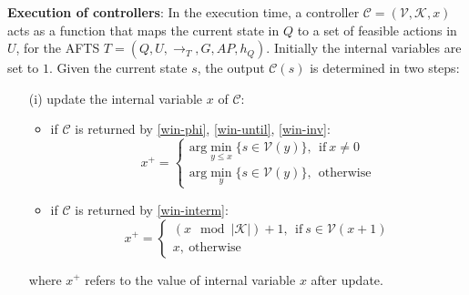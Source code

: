 
\begin{definition} \textbf{Execution of controllers}:
	In the execution time, a controller $ \mathcal{C}=(\mathcal{V},\mathcal{K},x) $ acts as a function that maps the current state in $ Q $ to a set of feasible actions in $ U $, for the AFTS $ T = (Q,U,\rightarrow_T, G,AP,h_Q)$. Initially the internal variables are set to $ 1 $. Given the current state $ s $, the output $ \mathcal{C}(s) $ is determined in two steps:
	\begin{itemize}
		\item[(i)] update the internal variable $ x $ of $ \mathcal{C} $: 
		\begin{itemize}
			\item 	if $ \mathcal{C} $ is returned by \eqref{win-phi}, \eqref{win-until}, \eqref{win-inv}:
			\begin{displaymath}
			x^+ =	\begin{cases}
			\text{arg}\min_{y\leq x}\{s\in \mathcal{V}(y)\},\ \ \text{if}\ x\not=0\\
			\text{arg}\min_{y}\{s\in \mathcal{V}(y)\},\ \ \text{otherwise}
			\end{cases}
			\end{displaymath}
			\item  if $ \mathcal{C} $ is returned by \eqref{win-interm}: %
			\begin{displaymath}
			x^+ = \begin{cases}
			(x\mod\vert\mathcal{K}\vert) + 1,\ \ \text{if}\ s\in \mathcal{V}(x+1)\\
			x,\ \text{otherwise}
			\end{cases}
			\end{displaymath}
		\end{itemize}
		where $ x^+ $ refers to the value of internal variable $ x $ after update.
		

\end{itemize}
\end{definition}
